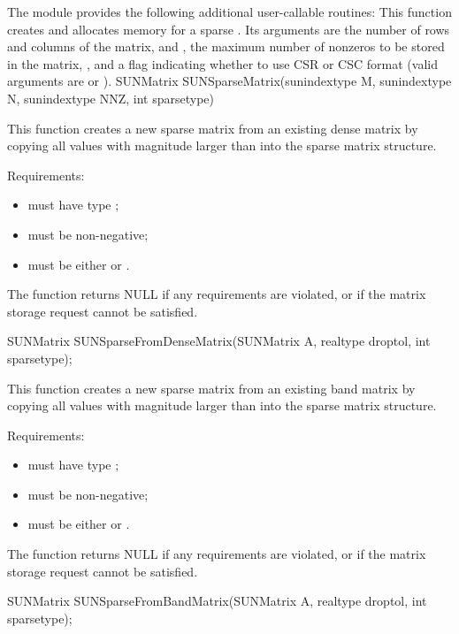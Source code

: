The module {\sunmatsparse} provides the following additional
user-callable routines: 
{
  This function creates and allocates memory for a sparse .
  Its arguments are the number of rows and columns of the
  matrix,  and , the maximum number of nonzeros to be
  stored in the matrix, , and a flag 
  indicating whether to use CSR or CSC format (valid arguments
  are  or ). 
}
{
  SUNMatrix SUNSparseMatrix(sunindextype M, sunindextype N,
  sunindextype NNZ, int sparsetype)
}
{
  This function creates a new sparse matrix from an existing dense
  matrix by copying all values with magnitude larger than 
  into the sparse matrix structure.

  Requirements:
  \begin{itemize}
  \item {} must have type ;
  \item {} must be non-negative;
  \item {} must be either  or .
  \end{itemize}
  The function returns NULL if any requirements are violated, or if
  the matrix storage request cannot be satisfied. 
}
{
  SUNMatrix SUNSparseFromDenseMatrix(SUNMatrix A, realtype droptol,
  int sparsetype);
}
{
  This function creates a new sparse matrix from an existing band
  matrix by copying all values with magnitude larger than 
  into the sparse matrix structure.

  Requirements:
  \begin{itemize}
  \item {} must have type ;
  \item {} must be non-negative;
  \item {} must be either  or .
  \end{itemize}
  The function returns NULL if any requirements are violated, or if
  the matrix storage request cannot be satisfied. 
}
{
  SUNMatrix SUNSparseFromBandMatrix(SUNMatrix A, realtype droptol,
  int sparsetype);
}
